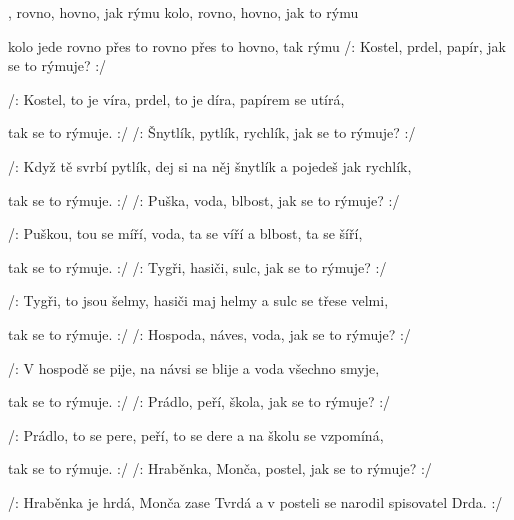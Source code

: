 

\zs
{}, rovno, hovno, jak  rýmu
kolo, rovno, hovno, jak  to rýmu

kolo jede  rovno přes to 
rovno přes to hovno, tak  rýmu
\ks
\zs
/: Kostel, prdel, papír, jak se to rýmuje? :/

/: Kostel, to je víra, prdel, to je díra, papírem se utírá,

tak se to rýmuje. :/
\ks
\zs
/: Šnytlík, pytlík, rychlík, jak se to rýmuje? :/

/: Když tě svrbí pytlík, dej si na něj šnytlík a pojedeš jak rychlík,

tak se to rýmuje. :/
\ks
\zs
/: Puška, voda, blbost, jak se to rýmuje? :/

/: Puškou, tou se míří, voda, ta se víří a blbost, ta se šíří,

tak se to rýmuje. :/
\ks
\zs
/: Tygři, hasiči, sulc, jak se to rýmuje? :/

/: Tygři, to jsou šelmy, hasiči maj helmy a sulc se třese velmi,

tak se to rýmuje. :/
\ks
\zs
/: Hospoda, náves, voda, jak se to rýmuje? :/

/: V hospodě se pije, na návsi se blije a voda všechno smyje,

tak se to rýmuje. :/
\ks
\zs
/: Prádlo, peří, škola, jak se to rýmuje? :/

/: Prádlo, to se pere, peří, to se dere a na školu se vzpomíná,

tak se to rýmuje. :/
\ks
\zs
/: Hraběnka, Monča, postel, jak se to rýmuje? :/

/: Hraběnka je hrdá, Monča zase Tvrdá a v posteli se narodil spisovatel Drda. :/
\ks


\kp
